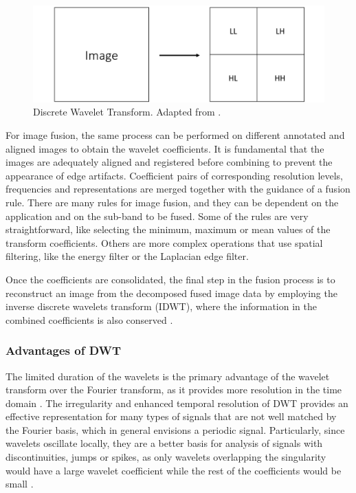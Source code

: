 \documentclass{article}
\begin{document}
    \begin{figure}[hbt!]
        \centering
        \includegraphics[width=\linewidth]{Img/DWT.png}
        \caption{ Discrete Wavelet Transform. Adapted from \cite{Chiorean.Vaida.2009}.}
        \label{DWT}
    \end{figure}

For image fusion, the same process can be performed on different annotated and aligned images to obtain the wavelet coefficients. It is fundamental that the images are adequately aligned and registered before combining to prevent the appearance of edge artifacts. Coefficient pairs of corresponding resolution levels, frequencies and representations are merged together with the guidance of a fusion rule. There are many rules for image fusion, and they can be dependent on the application and on the sub-band to be fused. Some of the rules are very straightforward, like selecting the minimum, maximum or mean values of the transform coefficients. Others are more complex operations that use spatial filtering, like the energy filter or the Laplacian edge filter. \cite{Pajares.Delacruz.2004, Chiorean.Vaida.2009}

Once the coefficients are consolidated, the final step in the fusion process is to reconstruct an image from the decomposed fused image data by employing the inverse discrete wavelets transform (IDWT), where the information in the combined coefficients is also conserved \cite{Wang2004, Pajares.Delacruz.2004, Liu2010, Peng2015}.

\subsubsection{Advantages of DWT}
The limited duration of the wavelets is the primary advantage of the wavelet transform over the Fourier transform, as it provides more resolution in the time domain \cite{Gonzalez.Woods.2008}. The irregularity and enhanced temporal resolution of DWT provides an effective representation for many types of signals that are not well matched by the Fourier basis, which in general envisions a periodic signal. Particularly, since wavelets oscillate locally, they are a better basis for analysis of signals with discontinuities, jumps or spikes, as only wavelets overlapping the singularity would have a large wavelet coefficient while the rest of the coefficients would be small \cite{IvanW.Selesnick.2005, Cheng.He.Lv.2008}. 
\end{document}
